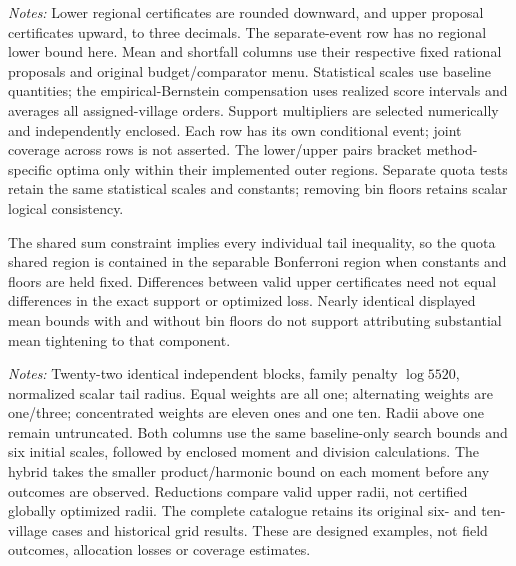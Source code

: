 \documentclass[11pt]{article}
\begin{document}
\begin{table}[htbp]
\centering\caption{Existing-method comparisons for the same allocation proposals}\label{tab:methodcomparison}

\begin{minipage}{\textwidth}\footnotesize\emph{Notes:} Lower regional certificates are rounded downward, and upper proposal certificates upward, to three decimals. The separate-event row has no regional lower bound here. Mean and shortfall columns use their respective fixed rational proposals and original budget/comparator menu. Statistical scales use baseline quantities; the empirical-Bernstein compensation uses realized score intervals and averages all assigned-village orders. Support multipliers are selected numerically and independently enclosed. Each row has its own conditional event; joint coverage across rows is not asserted. The lower/upper pairs bracket method-specific optima only within their implemented outer regions. Separate quota tests retain the same statistical scales and constants; removing bin floors retains scalar logical consistency.\end{minipage}
\end{table}

The shared sum constraint implies every individual tail inequality, so the quota shared region is contained in the separable Bonferroni region when constants and floors are held fixed. Differences between valid upper certificates need not equal differences in the exact support or optimized loss. Nearly identical displayed mean bounds with and without bin floors do not support attributing substantial mean tightening to that component.

\begin{table}[htbp]
\centering\caption{Weight concentration and quota-moment gains in twelve-village blocks}\label{tab:designcomparison}

\begin{minipage}{\textwidth}\footnotesize\emph{Notes:} Twenty-two identical independent blocks, family penalty $\log5520$, normalized scalar tail radius. Equal weights are all one; alternating weights are one/three; concentrated weights are eleven ones and one ten. Radii above one remain untruncated. Both columns use the same baseline-only search bounds and six initial scales, followed by enclosed moment and division calculations. The hybrid takes the smaller product/harmonic bound on each moment before any outcomes are observed. Reductions compare valid upper radii, not certified globally optimized radii. The complete catalogue retains its original six- and ten-village cases and historical grid results. These are designed examples, not field outcomes, allocation losses or coverage estimates.\end{minipage}
\end{table}
\end{document}
